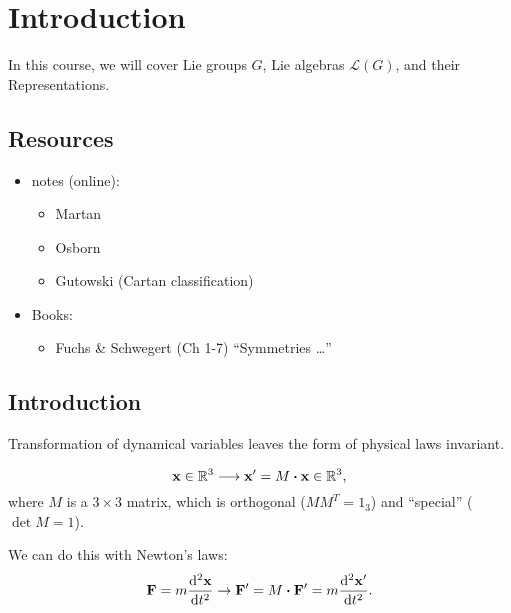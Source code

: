 \chapter{Introduction}%
\label{cha:introduction}

In this course, we will cover Lie groups $G$, Lie algebras $\mathscr{L}(G)$, and their Representations.

\section*{Resources}%
\label{sec:resources}

\begin{itemize}
  \item notes (online):
    \begin{itemize}
      \item Martan
      \item Osborn
      \item Gutowski (Cartan classification)
    \end{itemize}
  \item Books:
    \begin{itemize}
      \item Fuchs \& Schwegert (Ch 1-7) ``Symmetries \dots''
    \end{itemize}
\end{itemize}

\section{Introduction}%
\label{sec:introduction}

\begin{definition}[Symmetry]
Transformation of dynamical variables leaves the form of physical laws invariant.
\end{definition}

\begin{example}[Rotation]
  \begin{equation}
    \vb x \in \mathbb{R}^{3} \longrightarrow \vb x' = M \vdot \vb x \in \mathbb{R}^{3},
  \end{equation}
  where $M$ is a $3\times 3$ matrix, which is orthogonal ($M M^T = 1_{3}$) and ``special'' ($\det M = 1$).

  We can do this with Newton's laws:
  \begin{equation}
    \vb F = m \dv[2]{\vb x}{t} \rightarrow \vb F' = M \vdot \vb F' = m \dv[2]{\vb x'}{t}.
  \end{equation}
\end{example}

